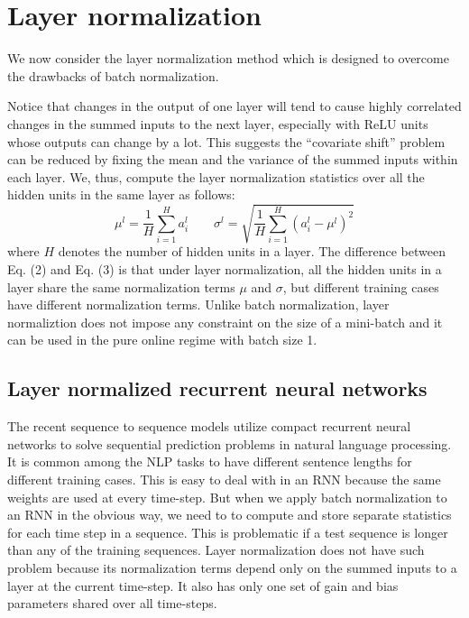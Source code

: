 \documentclass{article}
\newcommand{\act}{{a}}
\begin{document}
\section{Layer normalization}

We now consider the layer normalization method which is designed to overcome the drawbacks of batch normalization. 

Notice that changes in the output of one layer will tend to cause highly correlated changes in the summed inputs to the next layer, especially with ReLU units whose outputs can change by a lot.  
This suggests the ``covariate shift'' problem can be reduced by fixing the mean and the variance of the summed inputs within each layer. We, thus, compute the layer normalization statistics over all the hidden units in the same layer as follows:
\begin{equation}
\mu^l = \frac{1}{H}\sum_{i = 1}^H  \act^l_i
\qquad
\sigma^l = \sqrt{\frac{1}{H}\sum_{i = 1}^H  \left( \act^l_i  - \mu^l \right)^2}
\label{eq:ln}
\end{equation}
where $H$ denotes the number of hidden units in a layer. The difference between Eq. (2) and Eq. (3) is that under layer normalization, all the hidden units in a layer share the same normalization terms $\mu$ and $\sigma$, but different training cases have different normalization terms. 
Unlike batch normalization, layer normaliztion does not impose any constraint on the size of a mini-batch and it can be used in the pure online regime with batch size 1. 

\subsection{Layer normalized recurrent neural networks}

The recent sequence to sequence models \citep{sutskever2014sequence} utilize compact recurrent neural networks to solve sequential prediction problems in natural language processing.  It is common among the NLP tasks to have different sentence lengths for different training cases. This is easy to deal with in an RNN because the same weights are used at every time-step. But when we apply batch normalization to an RNN in the obvious way, we need to to compute and store separate statistics for each time step in a sequence. This is problematic if a test sequence is longer than any of the training sequences. Layer normalization does not have such problem because its normalization terms depend only on the summed inputs to a layer at the current time-step. It also has only one set of gain and bias parameters shared over all time-steps.
\end{document}
